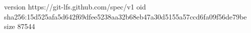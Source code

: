 version https://git-lfs.github.com/spec/v1
oid sha256:15d525afa5d642f69dfee5238aa32b68eb47a30d5155a57ccd6fa09f56de79be
size 87544
